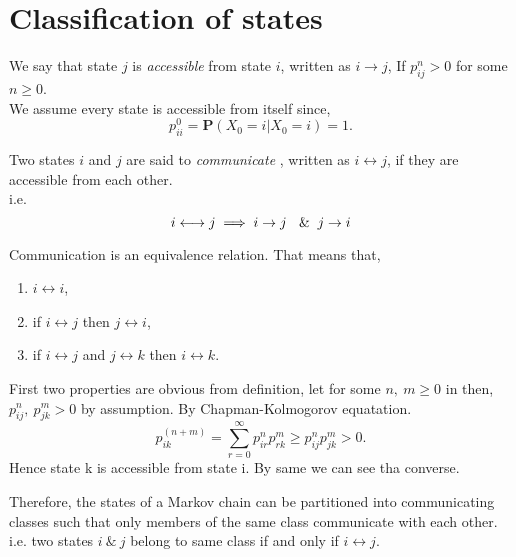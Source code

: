 \section{Classification of states}
\begin{definition}[]
    We say that state $j$ is \textit{accessible} from state $i$, written as $ i \to j $, If  $ p^{n}_{ij}>0 $ for some $ n\ge 0 $.\\ 
    We assume every state is accessible from itself since,
    \[
        p^{0}_{ii} = \mathbf{P}(X_{0}=i|X_{0}=i) = 1.
    \]
\end{definition}

\begin{definition}[]
    Two states $i$ and $j$ are said to \textit{communicate} , written as $ i \longleftrightarrow j $, if they are accessible from each other.\\ 
    i.e.
    \[
        i\longleftrightarrow j \implies i \to j \ \And j\to i
    \]
\end{definition}

Communication is an equivalence relation. That means that,
\begin{enumerate}
    \item $ i\longleftrightarrow i $,
    \item if $ i\longleftrightarrow j $ then  $ j\longleftrightarrow i$,
    \item if  $ i\longleftrightarrow j $ and  $ j\longleftrightarrow k $ then  $ i\longleftrightarrow k $.
\end{enumerate}

First two properties are obvious from definition, let for some $n,\ m \ge 0$ in  then, $ p^{n}_{ij},\ p^{m}_{jk}>0 $ by assumption.
By Chapman-Kolmogorov equatation.
\[
    p^{(n+m)}_{ik} = \sum_{r=0}^{\infty} p^{n}_{ir}p^{m}_{rk} \ge p^{n}_{ij}p^{m}_{jk}>0.
\]
Hence state k is accessible from state i. By same we can see tha converse.

Therefore, the states of a Markov chain can be partitioned into communicating classes such that 
only members of the same class communicate with each other. 
i.e. two states $ i \ \&\ j $ belong to same class if and only if $ i\longleftrightarrow j $.

